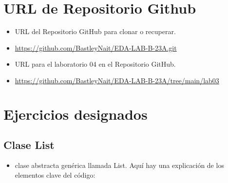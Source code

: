 \documentclass{article}
\begin{document}
	\section{URL de Repositorio Github}
	\begin{itemize}
		\item URL del Repositorio GitHub para clonar o recuperar.
		\item \url{https://github.com/BastleyNait/EDA-LAB-B-23A.git}
		\item URL para el laboratorio 04 en el Repositorio GitHub.
		\item \url{https://github.com/BastleyNait/EDA-LAB-B-23A/tree/main/lab03}
	\end{itemize}
	
	\section{Ejercicios designados}

	\subsection{Clase List}
	\begin{itemize}	
		\item  clase abstracta genérica llamada List. Aquí hay una explicación de los elementos clave del código:
	\end{itemize}	
	
		
\end{document}
